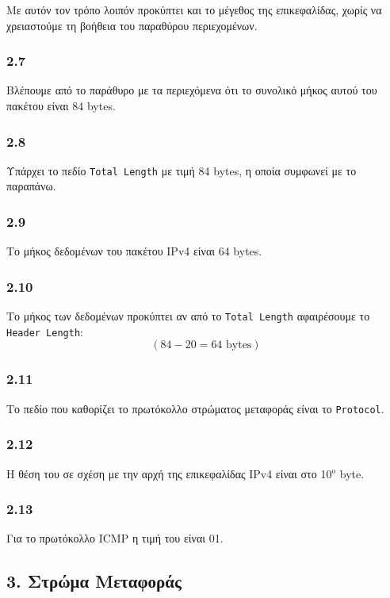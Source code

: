 			Με αυτόν τον τρόπο λοιπόν προκύπτει και το μέγεθος της επικεφαλίδας, χωρίς να χρειαστούμε τη βοήθεια του παραθύρου περιεχομένων.
			
		\subsubsection*{2.7}
			Βλέπουμε από το παράθυρο με τα περιεχόμενα ότι το συνολικό μήκος αυτού του πακέτου είναι 84 bytes.
		
		\subsubsection*{2.8}
			Υπάρχει το πεδίο \verb|Total Length| με τιμή 84 bytes, η οποία συμφωνεί με το παραπάνω.
		
		\subsubsection*{2.9}
			Το μήκος δεδομένων του πακέτου IPv4 είναι 64 bytes.
			
		
		\subsubsection*{2.10}
			Το μήκος των δεδομένων προκύπτει αν από το \verb|Total Length| αφαιρέσουμε το \verb|Header Length|: 
				\[
					(84 - 20 = 64 \text{ bytes})
				\]
		
		\subsubsection*{2.11}
			Το πεδίο που καθορίζει το πρωτόκολλο στρώματος μεταφοράς είναι το \verb|Protocol|.
		
		\subsubsection*{2.12}
			Η θέση του σε σχέση με την αρχή της επικεφαλίδας IPv4 είναι στο 10$^{\text{ο}}$ byte.
		
		\subsubsection*{2.13}
			Για το πρωτόκολλο ICMP η τιμή του είναι 01.
		
	\subsection*{3. Στρώμα Μεταφοράς}
		
